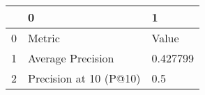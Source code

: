 \begin{tabular}{lll}
\toprule
{} &                       0 &         1 \\
\midrule
0 &                  Metric &     Value \\
1 &       Average Precision &  0.427799 \\
2 &  Precision at 10 (P@10) &       0.5 \\
\bottomrule
\end{tabular}
